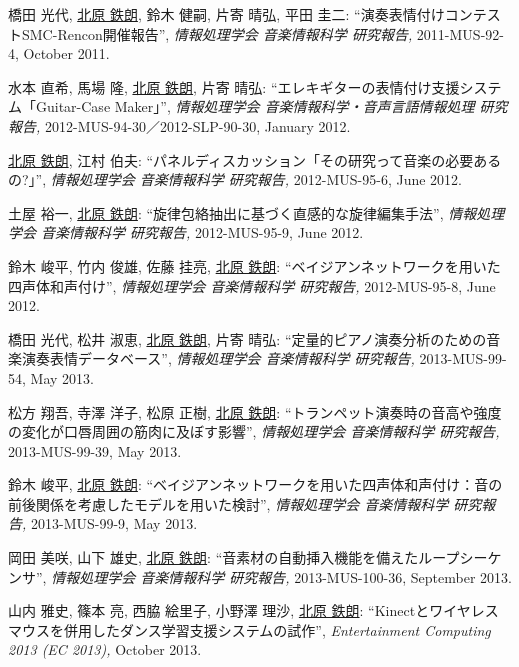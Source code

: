 \begin{Enumerate}
\item 
橋田 光代, 
\underline{北原 鉄朗}, 
鈴木 健嗣, 
片寄 晴弘, 
平田 圭二: 
    ``演奏表情付けコンテストSMC-Rencon開催報告'', 
    {\it 情報処理学会 音楽情報科学 研究報告,
    } 2011-MUS-92-4, October 2011. 

\item 
水本 直希, 
馬場 隆, 
\underline{北原 鉄朗}, 
片寄 晴弘: 
    ``エレキギターの表情付け支援システム「Guitar-Case Maker」'', 
    {\it 情報処理学会 音楽情報科学・音声言語情報処理 研究報告,
    } 2012-MUS-94-30／2012-SLP-90-30, January 2012. 

\item 
\underline{北原 鉄朗}, 
江村 伯夫: 
    ``パネルディスカッション「その研究って音楽の必要あるの?」'', 
    {\it 情報処理学会 音楽情報科学 研究報告,
    } 2012-MUS-95-6, June 2012. 

\item 
土屋 裕一, 
\underline{北原 鉄朗}: 
    ``旋律包絡抽出に基づく直感的な旋律編集手法'', 
    {\it 情報処理学会 音楽情報科学 研究報告,
    } 2012-MUS-95-9, June 2012. 

\item 
鈴木 峻平, 
竹内 俊雄, 
佐藤 挂亮, 
\underline{北原 鉄朗}: 
    ``ベイジアンネットワークを用いた四声体和声付け'', 
    {\it 情報処理学会 音楽情報科学 研究報告,
    } 2012-MUS-95-8, June 2012. 

\item 
橋田 光代, 
松井 淑恵, 
\underline{北原 鉄朗}, 
片寄 晴弘: 
    ``定量的ピアノ演奏分析のための音楽演奏表情データベース'', 
    {\it 情報処理学会 音楽情報科学 研究報告,
    } 2013-MUS-99-54, May 2013. 

\item 
松方 翔吾, 
寺澤 洋子, 
松原 正樹, 
\underline{北原 鉄朗}: 
    ``トランペット演奏時の音高や強度の変化が口唇周囲の筋肉に及ぼす影響'', 
    {\it 情報処理学会 音楽情報科学 研究報告,
    } 2013-MUS-99-39, May 2013. 

\item 
鈴木 峻平, 
\underline{北原 鉄朗}: 
    ``ベイジアンネットワークを用いた四声体和声付け：音の前後関係を考慮したモデルを用いた検討'', 
    {\it 情報処理学会 音楽情報科学 研究報告,
    } 2013-MUS-99-9, May 2013. 

\item 
岡田 美咲, 
山下 雄史, 
\underline{北原 鉄朗}: 
    ``音素材の自動挿入機能を備えたループシーケンサ'', 
    {\it 情報処理学会 音楽情報科学 研究報告,
    } 2013-MUS-100-36, September 2013. 

\item 
山内 雅史, 
篠本 亮, 
西脇 絵里子, 
小野澤 理沙, 
\underline{北原 鉄朗}: 
    ``Kinectとワイヤレスマウスを併用したダンス学習支援システムの試作'', 
    {\it Entertainment Computing 2013 (EC 2013),
    } October 2013. 


\end{Enumerate}
